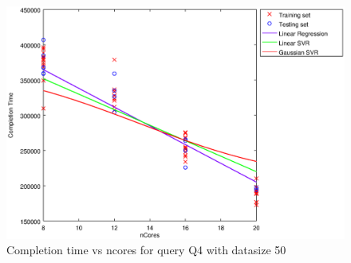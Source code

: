 
\begin {figure}[hbtp]
\centering
\includegraphics[width=\textwidth]{output/Q4_50_ALL_FEATURES/plot_Q4_50_bestmodels.eps}
\caption{Completion time vs ncores for query Q4 with datasize 50}
\label{fig:all_linear_Q4_50}
\end {figure}
